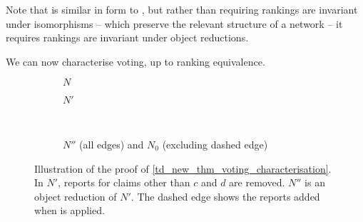 Note that \objectirrelevance{} is similar in form to \symmetry{}, but rather
than requiring rankings are invariant under isomorphisms -- which
preserve the relevant structure of a network -- it requires rankings are
invariant under object reductions.

We can now characterise voting, up to ranking equivalence.

\begin{figure}
    \centering
    \begin{subfigure}{.4\textwidth}
        \centering
        \caption{$N$}
    \end{subfigure}
    \begin{subfigure}{.4\textwidth}
        \centering
        \caption{$N'$}
    \end{subfigure}
    \\
    \begin{subfigure}{.9\textwidth}
        \centering
        \caption{
            $N''$ (all edges) and $N_0$ (excluding dashed edge)
        }
    \end{subfigure}
    \caption{
        Illustration of the proof of \cref{td_new_thm_voting_characterisation}.
        In $N'$, reports for claims other than $c$ and $d$ are removed. $N''$
        is an object reduction of $N'$. The dashed edge shows the reports added
        when \freshposresp{} is applied.
    }
    \label{td_new_fig_voting_characterisation_example}
\end{figure}


